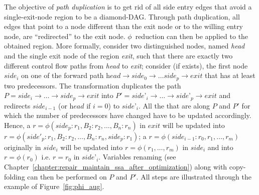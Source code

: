 The objective of \emph{path duplication} is to get rid of all side entry edges that avoid a single-exit-node region to be a diamond-DAG. Through path duplication, all edges that point to a node different than the exit node or to the willing entry node, are ``redirected'' to the exit node. $\phi$~reduction can then be applied to the obtained region. More formally, consider two distinguished nodes, named \textit{head} and the single exit node of the region \textit{exit}, such that there are exactly two different control flow paths from \textit{head} to \textit{exit}; consider (if exists), the first node $\textit{side}_i$ on one of the forward path $\textit{head}\rightarrow \textit{side}_0\rightarrow\dots\textit{side}_p\rightarrow\textit{exit}$ that has at least two predecessors. The transformation duplicates the path $P=\textit{side}_i\rightarrow\dots\rightarrow\textit{side}_p\rightarrow\textit{exit}$ into $P'=\textit{side'}_i\rightarrow\dots\rightarrow\textit{side'}_p\rightarrow\textit{exit}$ and redirects $\textit{side}_{i-1}$ (or $\textit{head}$ if $i=0$) to $\textit{side'}_i$. All the \phifuns that are along $P$ and $P'$  for which the number of predecessors have changed have to be updated accordingly. Hence, a $r=\phi(\textit{side}_p:r_1,B_2:r_2,\dots,B_n:r_n)$ in $\textit{exit}$  will be updated into $r=\phi(\textit{side}'_p:r_1,B_2:r_2,\dots,B_n:r_n,\textit{side}_p:r_1)$; a $r=\phi(\textit{side}_{i-1}:r_0, r_1, \dots, r_m)$ originally in $\textit{side}_i$ will be updated into $r=\phi(r_1, \dots, r_m)$ in $\textit{side}_i$ and into $r=\phi(r_0)$ i.e. $r=r_0$ in $\textit{side'}_i$. Variables renaming (see Chapter~\ref{chapter:repair_maintain_ssa_after_optimization}) along with copy-folding can then be performed on $P$ and $P'$. All steps are illustrated  through the example of Figure~\ref{fig:phi_aug}.


